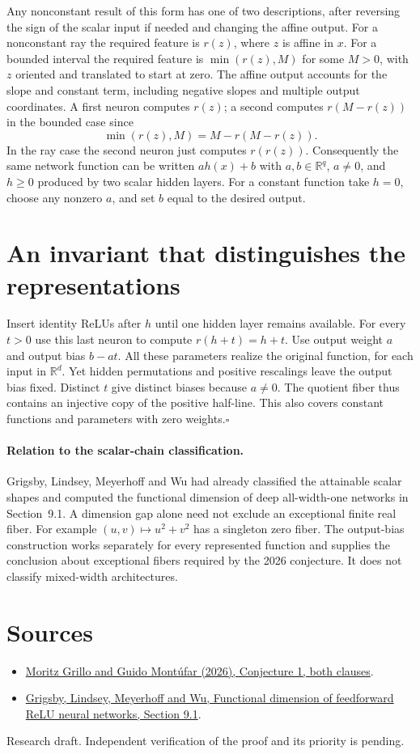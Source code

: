 \documentclass[11pt]{article}
\begin{document}
Any nonconstant result of this form has one of two descriptions, after reversing the sign of the scalar input if needed and changing the affine output. For a nonconstant ray the required feature is $r(z)$, where $z$ is affine in $x$. For a bounded interval the required feature is $\min(r(z),M)$ for some $M>0$, with $z$ oriented and translated to start at zero. The affine output accounts for the slope and constant term, including negative slopes and multiple output coordinates. A first neuron computes $r(z)$; a second computes $r(M-r(z))$ in the bounded case since
\[
 \min(r(z),M)=M-r(M-r(z)).
\]
In the ray case the second neuron just computes $r(r(z))$. Consequently the same network function can be written $a h(x)+b$ with $a,b\in\mathbb R^q$, $a\ne0$, and $h\ge0$ produced by two scalar hidden layers. For a constant function take $h=0$, choose any nonzero $a$, and set $b$ equal to the desired output.

\section*{An invariant that distinguishes the representations}
Insert identity ReLUs after $h$ until one hidden layer remains available. For every $t>0$ use this last neuron to compute $r(h+t)=h+t$. Use output weight $a$ and output bias $b-at$. All these parameters realize the original function, for each input in $\mathbb R^d$. Yet hidden permutations and positive rescalings leave the output bias fixed. Distinct $t$ give distinct biases because $a\ne0$. The quotient fiber thus contains an injective copy of the positive half-line. This also covers constant functions and parameters with zero weights.\hfill$\square$

\paragraph{Relation to the scalar-chain classification.} Grigsby, Lindsey, Meyerhoff and Wu had already classified the attainable scalar shapes and computed the functional dimension of deep all-width-one networks in Section~9.1. A dimension gap alone need not exclude an exceptional finite real fiber. For example $(u,v)\mapsto u^2+v^2$ has a singleton zero fiber. The output-bias construction works separately for every represented function and supplies the conclusion about exceptional fibers required by the 2026 conjecture. It does not classify mixed-width architectures.

\section*{Sources}
\begin{itemize}
\item \href{https://arxiv.org/abs/2605.03601}{Moritz Grillo and Guido Mont\'ufar (2026), Conjecture 1, both clauses}.
\item \href{https://arxiv.org/abs/2209.04036}{Grigsby, Lindsey, Meyerhoff and Wu, Functional dimension of feedforward ReLU neural networks, Section 9.1}.
\end{itemize}
{\small Research draft. Independent verification of the proof and its priority is pending.}
\end{document}
